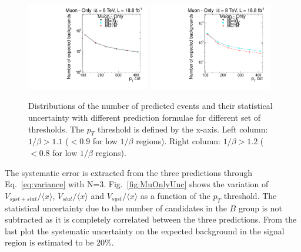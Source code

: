 \begin{figure}
\begin{center}
\includegraphics[clip=false, trim=0.0cm 0cm 0.0cm 0cm, width=0.48\textwidth]{figures/muonly/Data8TeVCollisionPrediction_TOF110}
\includegraphics[clip=false, trim=0.0cm 0cm 0.0cm 0cm, width=0.48\textwidth]{figures/muonly/Data8TeVCollisionPrediction_TOF120}
\caption[Distributions of the number of predicted events with different prediction formulae for different sets of thresholds in the \muononly\ analysis.]
{Distributions of the number of predicted events and their statistical uncertainty with different prediction formulae for different set of thresholds.
The $p_{T}$ threshold is defined by the x-axis.
Left column: $1/\beta>1.1$ ($<0.9$ for low $1/\beta$ regions). Right column: $1/\beta>1.2$ ($<0.8$ for low $1/\beta$ regions).}
\label{fig:MuOnlycorrelation}
\end{center}
\end{figure}

The systematic error is extracted from the three predictions
through Eq.~\ref{eq:variance} with N=3.
Fig.~\ref{fig:MuOnlyUnc} shows the variation of
$V_{syst+stat}/\langle x \rangle $, $V_{stat}/ \langle x \rangle $ and $V_{syst}/ \langle x \rangle $
as a function of the $p_T$ threshold. The statistical uncertainty due to the number of candidates in the $B$ group is not subtracted as it is completely correlated
between the three predictions. From the last plot
the systematic uncertainty on the expected background in the signal
region is estimated to be 20\%.


